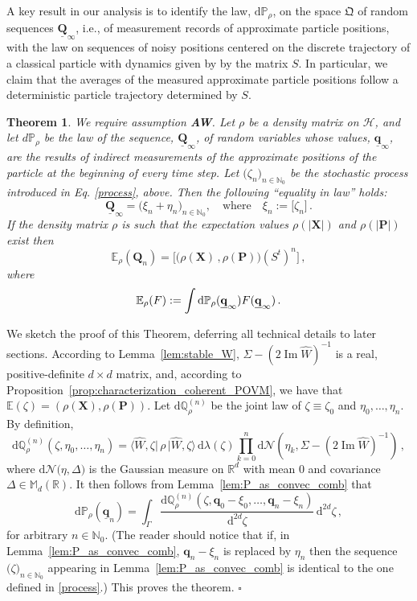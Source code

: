 \documentclass[11pt]{article}
\newtheorem{theorem}{Theorem}[section]
\renewcommand{\Im}{\operatorname{Im}}
\renewcommand{\d}{{\mathrm d}}
\begin{document}
A key result in our analysis is to identify the law, $\d\mathbb{P}_{\rho}$, on the space $\mathfrak{Q}$ of random 
sequences $\underline{\mathbf{Q}}_{\infty}$, i.e., of measurement records of approximate particle positions, 
with the law on sequences of noisy positions centered on the discrete trajectory of a classical particle with 
dynamics given by by the matrix $S$. In particular, we claim that the averages of 
the measured approximate particle positions follow a deterministic particle trajectory determined
by $S$.

\begin{theorem}\label{thm:Q_and_AR}
We require assumption {\bf{AW}}. Let $\rho$ be a density matrix on $\mathcal{H}$, and let $d\mathbb{P}_{\rho}$ be the law of the sequence, $\underline{\mathbf{Q}}_{\infty}$, of random variables whose values, $\underline{\mathbf{q}}_{\infty}$, are the results of indirect measurements of the approximate positions of the particle at the beginning of every time step. Let $\big(\zeta_n \big)_{n\in \mathbb{N}_0}$ be the stochastic process introduced in Eq. \eqref{process}, above. Then the following ``equality in law'' holds:
$$\underline{\mathbf{Q}}_{\infty} = \Big( \xi_n + \eta_n \Big)_{n\in \mathbb{N}_0}, \quad \text{where}\quad  \xi_n:=\big[\zeta_{n} \big] \,.$$
If the density matrix $\rho$ is such that the expectation values $\rho(\vert \mathbf{X} \vert)$ and $\rho(\vert \mathbf{P}\vert)$ exist then 
$$\mathbb{E}_{\rho}(\mathbf{Q}_n) = \big[ \big(\rho(\mathbf{X})\,, \rho(\mathbf{P})\big)(S^{t})^{n} \big]\,,$$
where
$$\mathbb{E}_{\rho}(F):=\int \d\mathbb{P}_{\rho}(\underline{\bf{q}}_{\infty}) F(\underline{\mathbf{q}}_{\infty})\,.$$
\end{theorem}     

We sketch the proof of this Theorem, deferring all technical details to later sections. According to Lemma~\ref{lem:stable_W},
$\Sigma-(2\Im\widehat W)^{-1}$ is a real, positive-definite $d\times d$ matrix, and, according to Proposition~\ref{prop:characterization_coherent_POVM}, we have that 
$\mathbb E(\zeta)=(\rho(\mathbf{X}),\rho(\mathbf{P}))$. 
Let $\d\mathbb Q_\rho^{(n)}$ be the joint law of $\zeta \equiv \zeta_0$ and $\eta_0,\dotsc,\eta_n$. By definition,
$$ \d \mathbb Q_\rho^{(n)}(\zeta, \eta_0,\dots, \eta_n)=\langle\widehat{W},\zeta \vert\,\rho\, \vert \widehat{W},\zeta \rangle \,
\d\lambda(\zeta) \prod_{k=0}^n \d \mathcal N(\eta_k,\Sigma-(2\Im\widehat W)^{-1})\,,$$
where $\d \mathcal{N}\big(\eta, \Delta\big)$ is the Gaussian measure on $\mathbb{R}^{d}$ with mean $0$ and covariance 
$\Delta \in \mathbb{M}_{d}(\mathbb{R})$. 
It then follows from Lemma~\ref{lem:P_as_convec_comb} that 
$$\d\mathbb{P}_\rho(\underline{\mathbf{q}}_n) = \int_{\Gamma} 
\frac{\d\mathbb Q_\rho^{(n)}(\zeta, \mathbf q_0 -\xi_0,\dots,\mathbf{q}_n-\xi_n)}{\d^{2d}\zeta} \, \d^{2d}\zeta\,,$$
for arbitrary $n\in \mathbb{N}_0$. (The reader should notice that if, in Lemma~\ref{lem:P_as_convec_comb},  
$\mathbf{q}_n - \xi_n$ is replaced by $\eta_n$ then the sequence $\big( \zeta \big)_{n \in \mathbb{N}_0}$ 
appearing in Lemma~\ref{lem:P_as_convec_comb} is identical to the one defined in \eqref{process}.)
 This proves the theorem.  \hspace{8.5cm}$\square$
 
\end{document}
